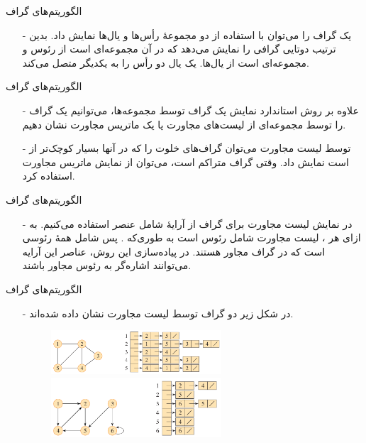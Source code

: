 \begin{frame}{‌الگوریتم‌های گراف}
\begin{itemize}\itemr
\item[-]
یک گراف را می‌توان با استفاده از دو مجموعهٔ رأس‌ها
و یال‌ها
نمایش داد. بدین ترتیب دوتایی
گرافی را نمایش می‌دهد که در آن
مجموعه‌ای است از رئوس و
مجموعه‌ای است از یال‌ها. یک یال دو رأس را به یکدیگر متصل می‌کند.
\end{itemize}
\end{frame}


\begin{frame}{‌الگوریتم‌های گراف}
\begin{itemize}\itemr
\item[-]
علاوه بر روش استاندارد نمایش یک گراف توسط مجموعه‌ها، می‌توانیم یک گراف را توسط مجموعه‌ای از لیست‌های مجاورت
یا یک ماتریس مجاورت
نشان دهیم.
\item[-]
توسط لیست مجاورت می‌توان گراف‌های خلوت
را که در آنها
بسیار کوچک‌تر از
است نمایش داد.
وقتی گراف متراکم
است، می‌توان از نمایش ماتریس مجاورت استفاده کرد.
\end{itemize}
\end{frame}


\begin{frame}{‌الگوریتم‌های گراف}
\begin{itemize}\itemr
\item[-]
در نمایش لیست مجاورت
برای گراف
از آرایهٔ
شامل
عنصر استفاده می‌کنیم. به ازای هر
،
لیست مجاورت
شامل رئوس
 است به طوری‌که
. پس
شامل همهٔ رئوسی است که در گراف
مجاور
هستند. در پیاده‌سازی این روش،
عناصر این آرایه می‌توانند اشاره‌گر به رئوس مجاور باشند.
\end{itemize}
\end{frame}


\begin{frame}{‌الگوریتم‌های گراف}
\begin{itemize}\itemr
\item[-]
در شکل زیر دو گراف توسط لیست مجاورت نشان داده شده‌اند.
\begin{figure}
\includegraphics[width=0.6\textwidth]{figs/chap07/550-graph1-adj}
\includegraphics[width=0.6\textwidth]{figs/chap07/550-graph2-adj}
\end{figure}
\end{itemize}
\end{frame}


